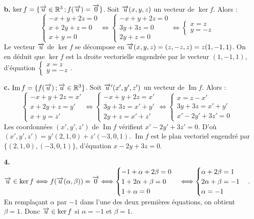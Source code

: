 \documentclass[11pt]{article}
\begin{document}
\textbf{b.} $\ker f = \{\overrightarrow{u} \in \mathbb{R}^3\,;f(\overrightarrow{u}) = \overrightarrow{0}\}$. Soit $\overrightarrow{u}(x, y, z)$ un vecteur de $\ker f$. Alors :
\[ \begin{cases} -x + y + 2z = 0 \\ x + 2y + z = 0 \\ x + y = 0 \end{cases} \Longleftrightarrow \begin{cases} -x + y + 2z = 0 \\ 3y + 3z = 0 \\ 2y + z = 0 \end{cases} \Longleftrightarrow \begin{cases} x = z \\ y = -z \end{cases} \]
Le vecteur $\overrightarrow{u}$ de $\ker f$ se décompose en $\overrightarrow{u}(x, y, z) = (z, -z, z) = z(1, -1, 1)$. On en déduit que $\ker f$ est la droite vectorielle engendrée par le vecteur $(1, -1, 1)$, d'équation $\begin{cases} x = z \\ y = -z \end{cases}$.

\textbf{c.} $\operatorname{Im} f = \{f(\overrightarrow{u})\,;\overrightarrow{u} \in \mathbb{R}^3\}$. Soit $\overrightarrow{u}'(x', y', z')$ un vecteur de $\operatorname{Im} f$. Alors :
\[ \begin{cases} -x + y + 2z = x' \\ x + 2y + z = y' \\ x + y = z' \end{cases} \Longleftrightarrow \begin{cases} -x + y + 2z = x' \\ 3y + 3z = x' + y' \\ 2y + z = x' + z' \end{cases} \Longleftrightarrow \begin{cases} x = z - x' \\ 3y + 3z = x' + y' \\ x' - 2y' + 3z' = 0 \end{cases} \]
Les coordonnées $(x', y', z')$ de $\operatorname{Im} f$ vérifient $x' - 2y' + 3z' = 0$. D'où $(x', y', z') = y'(2, 1, 0) + z'(-3, 0, 1)$. $\operatorname{Im} f$ est le plan vectoriel engendré par $\{(2, 1, 0), (-3, 0, 1)\}$, d'équation $x - 2y + 3z = 0$.

\textbf{4.} $\overrightarrow{u} \in \ker f \Longleftrightarrow f(\overrightarrow{u}(\alpha, \beta)) = \overrightarrow{0} \Longleftrightarrow \begin{cases} -1 + \alpha + 2\beta = 0 \\ 1 + 2\alpha + \beta = 0 \\ 1 + \alpha = 0 \end{cases} \Longleftrightarrow \begin{cases} \alpha + 2\beta = 1 \\ 2\alpha + \beta = -1 \\ \alpha = -1 \end{cases}$. En remplaçant $\alpha$ par $-1$ dans l'une des deux premières équations, on obtient $\beta = 1$. Donc $\overrightarrow{u} \in \ker f$ si $\alpha = -1$ et $\beta = 1$.
\end{document}
